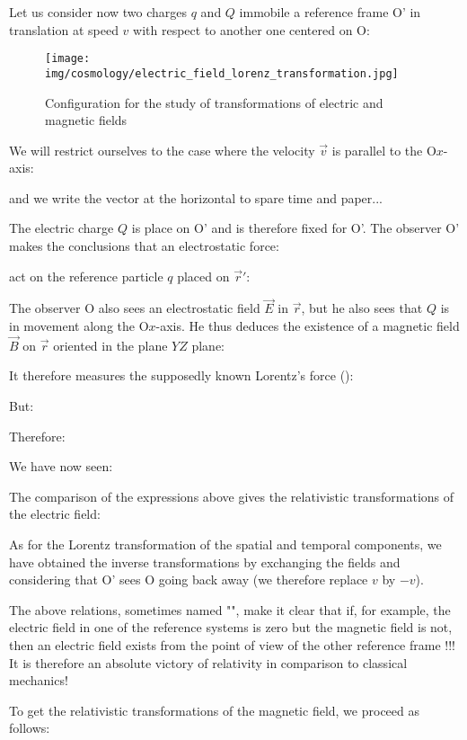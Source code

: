 	Let us consider now two charges $q$ and $Q$ immobile a reference frame O' in translation at speed $v$ with respect to another one centered on O:
	\begin{figure}[H]
		\centering
		\texttt{[image: img/cosmology/electric\_field\_lorenz\_transformation.jpg]}
		\caption{Configuration for the study of transformations of electric and magnetic fields}
	\end{figure}
	We will restrict ourselves to the case where the velocity $\vec{v}$ is parallel to the O$x$-axis:
	
	and we write the vector at the horizontal to spare time and paper...

	The electric charge $Q$ is place on O' and is therefore fixed for O'. The observer O' makes the conclusions that an electrostatic force:
	
	act on the reference particle $q$ placed on $\vec{r}'$:
	
	The observer O also sees an electrostatic field $\vec{E}$ in $\vec{r}$, but he also sees that $Q$ is in movement along the O$x$-axis. He thus deduces the existence of a magnetic field $\vec{B}$ on $\vec{r}$ oriented in the plane $YZ$ plane:
	
	It therefore measures the supposedly known Lorentz's force ():
	
	But:
	
	Therefore:
	
	We have now seen:
	
	The comparison of the expressions above gives the relativistic transformations of the electric field:
	
	As for the Lorentz transformation of the spatial and temporal components, we have obtained the inverse transformations by exchanging the fields and considering that O' sees O going back away (we therefore replace $v$ by $-v$).

	The above relations, sometimes named "", make it clear that if, for example, the electric field in one of the reference systems is zero but the magnetic field is not, then an electric field exists from the point of view of the other reference frame !!! It is therefore an absolute victory of relativity in comparison to classical mechanics!

	To get the relativistic transformations of the magnetic field, we proceed as follows:
	
